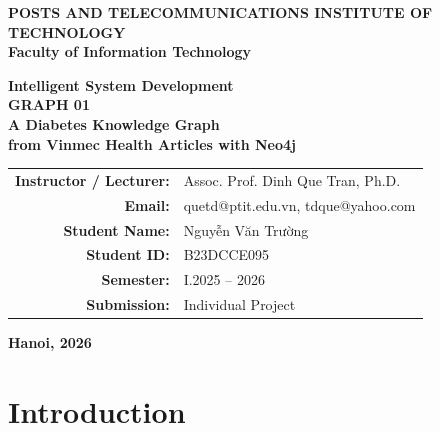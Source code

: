 \documentclass[11pt, a4paper]{article}
\begin{document}
\begin{titlepage}
\begin{center}

\vspace*{0.5cm}

\Large
\textbf{POSTS AND TELECOMMUNICATIONS INSTITUTE OF TECHNOLOGY}\\
\textbf{Faculty of Information Technology}

\vspace{2.0cm}

\Huge
\textbf{Intelligent System Development}\\
\vspace{0.4cm}
\LARGE
\textbf{GRAPH 01}\\
\vspace{0.6cm}
\Large
\textbf{A Diabetes Knowledge Graph\\from Vinmec Health Articles with Neo4j}

\vspace{1.2cm}

\vfill

\normalsize
\begin{tabular}{rl}
\textbf{Instructor / Lecturer:} & Assoc. Prof. Dinh Que Tran, Ph.D. \\
\textbf{Email:} & quetd@ptit.edu.vn, tdque@yahoo.com \\[0.8cm]
\textbf{Student Name:} & Nguyễn Văn Trường \\
\textbf{Student ID:} & B23DCCE095 \\
\textbf{Semester:} & I.2025 -- 2026 \\
\textbf{Submission:} & Individual Project \\
\end{tabular}

\vfill

\textbf{Hanoi, 2026}

\vspace{0.5cm}

\end{center}
\end{titlepage}

{\small\tableofcontents}
\newpage

\section{Introduction}
\end{document}
